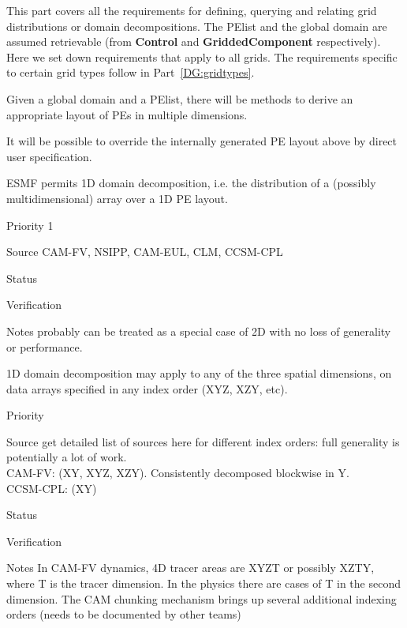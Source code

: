 
This part covers all the requirements for defining, querying and
relating grid distributions or domain decompositions. The PElist and
the global domain are assumed retrievable (from \textbf{Control} and
\textbf{GriddedComponent} respectively). Here we set down requirements
that apply to all grids. The requirements specific to certain grid
types follow in Part~\ref{DG:gridtypes}.



Given a global domain and a PElist, there will be methods to derive an
appropriate layout of PEs in multiple dimensions.


It will be possible to override the internally generated PE layout above
by direct user specification.


ESMF permits 1D domain decomposition, i.e. the distribution of a
(possibly multidimensional) array over a 1D PE layout.

\begin{reqlist}
\item[Priority] 1
\item[Source] CAM-FV, NSIPP, CAM-EUL, CLM, CCSM-CPL \\
\item[Status]
\item[Verification]
\item[Notes] probably can be treated as a special case of 2D with no
  loss of generality or performance.
\end{reqlist}


1D domain decomposition may apply to any of the three spatial
dimensions, on data arrays specified in any index order (XYZ, XZY,
etc).

\begin{reqlist}
\item[Priority]
\item[Source] get detailed list of sources here for different index
  orders: full generality is potentially a lot of work. \\
 CAM-FV: (XY, XYZ, XZY).  Consistently decomposed blockwise in Y. \\
 CCSM-CPL: (XY) \\
\item[Status]
\item[Verification]
\item[Notes]  In CAM-FV dynamics, 4D tracer areas are XYZT or
	possibly XZTY, where T is the tracer dimension.  In the physics
	there are cases of T in the second dimension.  The CAM
	chunking mechanism brings up several additional indexing
	orders (needs to be documented by other teams)
\end{reqlist}

